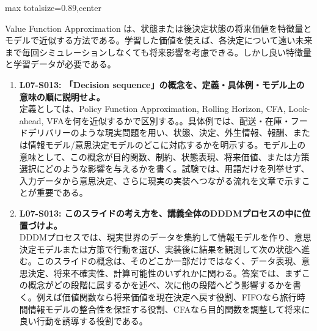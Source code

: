 \begin{minipage}[t]{0.58\textwidth}
\begin{adjustbox}{max totalsize={\textwidth}{0.89\textheight},center}
\begin{minipage}{\textwidth}
Value Function Approximation は、状態または後決定状態の将来価値を特徴量とモデルで近似する方法である。学習した価値を使えば、各決定について遠い未来まで毎回シミュレーションしなくても将来影響を考慮できる。しかし良い特徴量と学習データが必要である。\par{}\begin{enumerate}\item \textbf{L07-S013: 「Decision sequence」の概念を、定義・具体例・モデル上の意味の順に説明せよ。}\\定義としては、Policy Function Approximation, Rolling Horizon, CFA, Look-ahead, VFAを何を近似するかで区別する。。具体例では、配送・在庫・フードデリバリーのような現実問題を用い、状態、決定、外生情報、報酬、または情報モデル/意思決定モデルのどこに対応するかを明示する。モデル上の意味として、この概念が目的関数、制約、状態表現、将来価値、または方策選択にどのような影響を与えるかを書く。試験では、用語だけを列挙せず、入力データから意思決定、さらに現実の実装へつながる流れを文章で示すことが重要である。\item \textbf{L07-S013: このスライドの考え方を、講義全体のDDDMプロセスの中に位置づけよ。}\\DDDMプロセスでは、現実世界のデータを集約して情報モデルを作り、意思決定モデルまたは方策で行動を選び、実装後に結果を観測して次の状態へ進む。このスライドの概念は、そのどこか一部だけではなく、データ表現、意思決定、将来不確実性、計算可能性のいずれかに関わる。答案では、まずこの概念がどの段階に属するかを述べ、次に他の段階へどう影響するかを書く。例えば価値関数なら将来価値を現在決定へ戻す役割、FIFOなら旅行時間情報モデルの整合性を保証する役割、CFAなら目的関数を調整して将来に良い行動を誘導する役割である。\end{enumerate}
\end{minipage}
\end{adjustbox}
\end{minipage}


